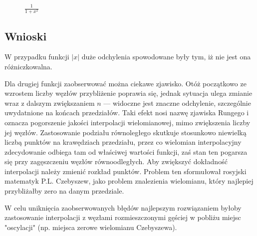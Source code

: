\documentclass{classrep}
\begin{document}
		
		\begin{figure}[!htbp]
			\centering
			 \hfill
			 \hfill
  			\caption{$\frac{1}{1+x^2}$}
  			\label{fig:4}
		\end{figure}	
	\subsection{Wnioski}	
		W przypadku funkcji $|x|$ duże odchylenia spowodowane były tym, iż nie jest ona różniczkowalna.
		
		Dla drugiej funkcji zaobserwować można ciekawe zjawisko. Otóż początkowo ze wzrostem liczby węzłów przybliżenie poprawia się, jednak sytuacja ulega zmianie wraz z dalszym zwiększaniem $n$ --- widoczne jest znaczne odchylenie, szczególnie uwydatnione na końcach przedziałów. Taki efekt nosi nazwę zjawiska Rungego i oznacza pogorszenie jakości interpolacji wielomianowej, mimo zwiększenia liczby jej węzłów.
		Zastosowanie podziału równoległego skutkuje stosunkowo niewielką liczbą punktów na krawędziach przedziału, przez co wielomian interpolacyjny zdecydowanie odbiega tam od właściwej wartości funkcji, zaś stan ten pogarsza się przy zagęszczeniu węzłów równoodległych.
		Aby zwiększyć dokładność interpolacji należy zmienić rozkład punktów. Problem ten sformułował rosyjski matematyk P.L. Czebyszew, jako problem znalezienia wielomianu, który najlepiej przybliżałby zero na danym przedziale. 
		
		W celu uniknięcia zaobserwowanych błędów najlepszym rozwiązaniem byłoby zastosowanie interpolacji z węzłami rozmieszczonymi gęściej w pobliżu miejsc "oscylacji" (np. miejsca zerowe wielomianu Czebyszewa).
		
\end{document}
